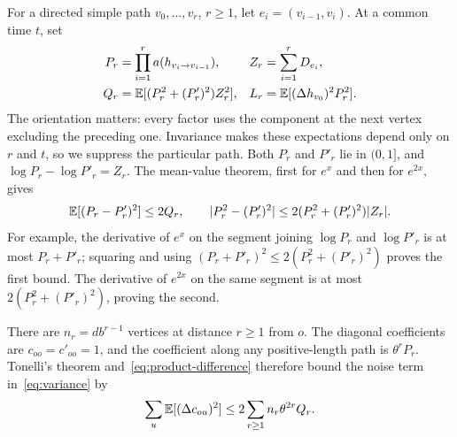 For a directed simple path $v_0,\ldots,v_r$, $r\ge1$, let
$e_i=(v_{i-1},v_i)$. At a common time $t$, set
\begin{equation}\label{eq:weighted-path-definitions}
 \begin{aligned}
 P_r&=\prod_{i=1}^r a(h_{v_i\to v_{i-1}}),
 &Z_r&=\sum_{i=1}^rD_{e_i},\\
 Q_r&=\mathbb E[(P_r^2+(P'_r)^2)Z_r^2],
 &L_r&=\mathbb E[(\Delta h_{v_0})^2P_r^2].
 \end{aligned}
\end{equation}
The orientation matters: every factor uses the component at the next
vertex excluding the preceding one. Invariance makes these expectations
depend only on $r$ and $t$, so we suppress the particular path. Both
$P_r$ and $P'_r$ lie in $(0,1]$, and
$\log P_r-\log P'_r=Z_r$. The mean-value theorem, first for
$e^x$ and then for $e^{2x}$, gives
\begin{equation}\label{eq:product-difference}
 \mathbb E[(P_r-P'_r)^2]\le2Q_r,
 \qquad
 |P_r^2-(P'_r)^2|
       \le2(P_r^2+(P'_r)^2)|Z_r|.
\end{equation}
For example, the derivative of $e^x$ on the segment joining
$\log P_r$ and $\log P'_r$ is at most $P_r+P'_r$; squaring and
using $(P_r+P'_r)^2\le2(P_r^2+(P'_r)^2)$ proves the first bound.
The derivative of $e^{2x}$ on the same segment is at most
$2(P_r^2+(P'_r)^2)$, proving the second.

There are $n_r=db^{r-1}$ vertices at distance $r\ge1$ from $o$.
The diagonal coefficients are $c_{oo}=c'_{oo}=1$, and the
coefficient along any positive-length path is $\theta^rP_r$.
Tonelli's theorem and~\eqref{eq:product-difference} therefore bound
the noise term in~\eqref{eq:variance} by
\begin{equation}\label{eq:noise-bound}
 \sum_u\mathbb E[(\Delta c_{ou})^2]
       \le2\sum_{r\ge1}n_r\theta^{2r}Q_r.
\end{equation}

